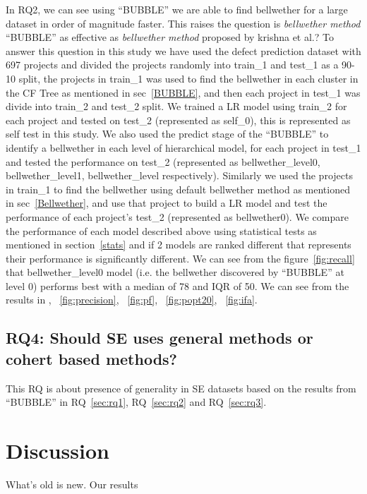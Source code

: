 \documentclass[sigconf]{acmart}
\theoremstyle{break}
\begin{document}
In RQ2, we can see using ``BUBBLE'' we are able to find bellwether for a large dataset in order of magnitude faster. This raises the question is  \textit{bellwether method} ``BUBBLE'' as effective as \textit{bellwether method} proposed by krishna et al.? To answer this question in this study we have used the defect prediction dataset with 697 projects and divided the projects randomly into train\_1 and test\_1 as a 90-10 split, the projects in train\_1 was used to find the bellwether in each cluster in the CF Tree as mentioned in sec~\ref{BUBBLE}, and then each project in test\_1 was divide into train\_2 and test\_2 split. We trained a LR model using train\_2 for each project and tested on test\_2 (represented as self\_0), this is represented as self test in this study. We also used the predict stage of the ``BUBBLE'' to identify a bellwether in each level of hierarchical model, for each project in test\_1 and tested the performance on test\_2 (represented as bellwether\_level0, bellwether\_level1, bellwether\_level respectively). Similarly we used the projects in train\_1 to find the bellwether using default bellwether method as mentioned in sec~\ref{Bellwether}, and use that project to build a LR model and test the performance of each project's test\_2 (represented as bellwether0). We compare the performance of each model described above using statistical tests as mentioned in section~\ref{stats} and if 2 models are ranked different that represents their performance is significantly different. We can see from the figure~\ref{fig:recall} that bellwether\_level0 model (i.e. the bellwether discovered by ``BUBBLE'' at level 0) performs best with a median of 78 and IQR of 50. 
We can see from the results in , ~\ref{fig:precision}, ~\ref{fig:pf}, ~\ref{fig:popt20}, ~\ref{fig:ifa}. 


\subsection{RQ4: Should SE uses general methods or cohert based methods?}
\label{sec:rq4}

This RQ is about presence of generality in SE datasets based on the results from ``BUBBLE'' in RQ~\ref{sec:rq1}, RQ~\ref{sec:rq2} and RQ~\ref{sec:rq3}. 

\section{Discussion}
\label{sec:discuss}
What's old is new. Our results 
\end{document}
